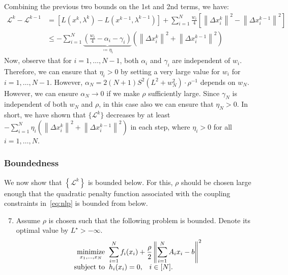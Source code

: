 \documentclass[11pt]{article}
\newcommand{\norm}[1]{\left\lVert #1 \right\rVert}
\begin{document}
Combining the previous two bounds on the 1st and 2nd terms, we have:
\begin{align*}
\mathcal{L}^k - \mathcal{L}^{k-1} &= \left[ L(x^k, \lambda^k) - L(x^{k-1}, \lambda^{k-1}) \right] + \sum_{i=1}^N \frac{w_i}{4} \left[\norm{\Delta x_i^k}^2 - \norm{\Delta x_i^{k-1}}^2 \right] \\
&\leq -\sum_{i=1}^N \underset{\coloneqq \eta_i}{\underbrace{\left(\frac{w_i}{4} - \alpha_i - \gamma_i\right)}}\left(\norm{\Delta x_i^k}^2 + \norm{\Delta x_i^{k-1}}^2\right) 
\end{align*}
Now, observe that for $i =1, \ldots, N-1$, both $\alpha_i$ and $\gamma_i$ are independent of $w_i$. Therefore, we can ensure that $\eta_i > 0$ by setting a very large value for $w_i$ for $i = 1, \ldots, N-1$.
However, $\alpha_N = 2(N+1)S^2(L^2 + w_N^2)\cdot \rho^{-1}$ depends on $w_N$. However, we can ensure $\alpha_N \to 0$ if we make $\rho$ sufficiently large. 
Since $\gamma_N$ is independent of both $w_N$ and $\rho$, in this case also we can ensure that $\eta_N > 0$.
In short, we have shown that $\{\mathcal{L}^k\}$ decreases by at least $-\sum_{i=1}^N \eta_i \left(\norm{\Delta x_i^k}^2 + \norm{\Delta x_i^{k-1}}^2\right)$ in each step, where $\eta_i > 0$ for all $i = 1, \ldots, N$.

\subsubsection{Boundedness}\label{sec:lyapunov_bounded}
We now show that $\left\{\mathcal{L}^k\right\}$ is bounded below.
For this, $\rho$ should be chosen large enough that the quadratic penalty function associated with the coupling constraints in~\eqref{eq:nlp} is bounded from below.
\begin{enumerate}\setcounter{enumi}{6}
    \item\label{assume:penalty} Assume $\rho$ is chosen such that the following problem is bounded. Denote its optimal value by $L^\star > -\infty$.
    \[
    \begin{array}{r@{\;\;}l}
    \displaystyle\mathop{\text{minimize}}_{x_1, \ldots, x_N} & \displaystyle \sum_{i = 1}^N f_i(x_i) + \frac{\rho}{2} \norm{\sum_{i=1}^N A_ix_i - b}^2  \\
    \text{subject to} & \displaystyle  h_i(x_i) = 0, \;\;\; i \in [N].
    \end{array}
    \]
\end{enumerate}
\end{document}
